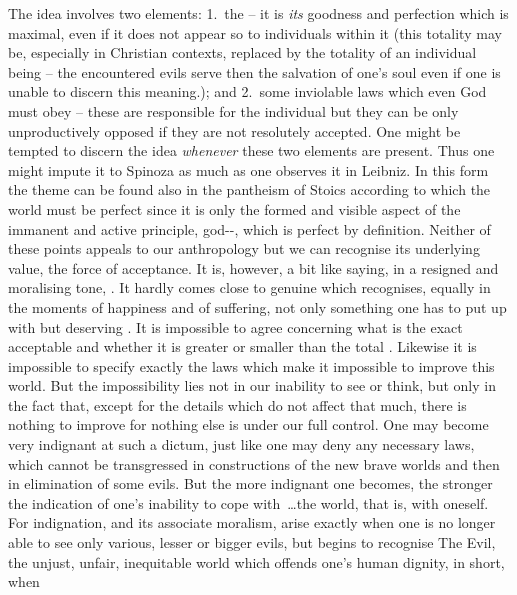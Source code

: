 {The idea involves two elements: 1.~the  -- it is {\em
  its} goodness and perfection which is maximal, even if it does not appear so
to individuals within it (this totality may be, especially in Christian
contexts, replaced by the totality of an individual being -- the encountered
evils serve then the salvation of one's soul even if one is unable to discern
this meaning.); and 2.~some inviolable laws which even God must obey -- these
are responsible for the individual  but they can be only
unproductively opposed if they are not resolutely accepted.  One might be
tempted to discern the idea {\em whenever} these two elements are present.
Thus one might impute it to Spinoza as much as one observes it in Leibniz. In
this form the theme can be found also in the pantheism of Stoics according to
which the world must be perfect since it is only the formed and visible aspect
of the immanent and active principle, god--, which is
perfect by definition. Neither of these points appeals
to our anthropology but we can recognise its underlying
value, the  force of acceptance. It is, however, a bit like
saying, in a resigned and moralising tone, .  It hardly comes close to genuine  which
recognises, equally in the moments of happiness and of suffering, not only
  something one has to put up with but  deserving .}
%  
It is impossible to agree concerning what is the exact acceptable  and whether it is greater or smaller than the total
. Likewise it is impossible to specify exactly the laws
which make it impossible to improve this world. But the impossibility lies not
in our inability to see or think, but only in the fact that, except for the
 details which do not affect that much, there is nothing to improve
for nothing else is under our full control. One may become very indignant at
such a dictum, just like one may deny any necessary laws, which cannot be
transgressed in constructions of the new brave worlds and then in elimination of some
evils. But the more indignant one becomes, the stronger the indication of one's
inability to cope with~\ldots the world, that is, with oneself. For indignation,
and its associate moralism, arise exactly when one is no longer able to see only
various, lesser or bigger evils, but begins to recognise The Evil, the unjust,
unfair, inequitable world which offends one's human dignity, in short, when
